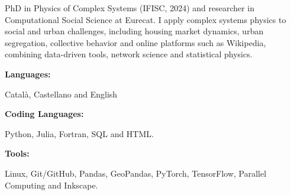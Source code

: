 \documentclass[9pt]{developercv} %
\begin{document}
\begin{minipage}[t]{0.46\textwidth}
        PhD in Physics of Complex Systems (IFISC, 2024) and researcher in Computational Social Science at Eurecat. I apply complex systems physics to social and urban challenges, including housing market dynamics, urban segregation, collective behavior and online platforms such as Wikipedia, combining data-driven tools, network science and statistical physics.\\
\end{minipage}
\hfill %
\begin{minipage}[t]{0.465\textwidth}
    \vspace{-6pt}
    
    \begin{minipage}[t]{0.22\textwidth}
        \textbf{Languages:}
    \end{minipage}
    \begin{minipage}[t]{0.7\textwidth}
      Català, Castellano and English
      \vspace{0.25 cm}
    \end{minipage}

    \begin{minipage}[t]{0.36\textwidth}
        \textbf{Coding Languages:}
    \end{minipage}
    \begin{minipage}[t]{0.64\textwidth}
      Python, Julia, Fortran, SQL and HTML.
      \vspace{0.25 cm}
    \end{minipage}

    \begin{minipage}[t]{0.12\textwidth}
        \textbf{Tools:}
    \end{minipage}
    \begin{minipage}[t]{0.88\textwidth}
      Linux, Git/GitHub, Pandas, GeoPandas, PyTorch, TensorFlow, Parallel Computing and Inkscape.
      \vspace{0.2 cm}
    \end{minipage}
    
\end{minipage}
\end{document}
